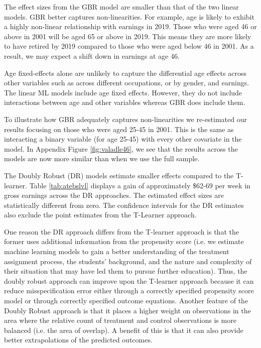 \documentclass[12pt, a4paper]{article}
\begin{document}
The effect sizes from the GBR model are smaller than that of the two linear models. GBR better captures non-linearities. For example, age is likely to exhibit a highly non-linear relationship with earnings in 2019. Those who were aged 46 or above in 2001 will be aged 65 or above in 2019. This means they are more likely to have retired by 2019 compared to those who were aged below 46 in 2001. As a result, we may expect a shift down in earnings at age 46. 

Age fixed-effects alone are unlikely to capture the differential age effects across other variables such as across different occupations, or by gender, and earnings. The linear ML models include age fixed effects. However, they do not include interactions between age and  other variables whereas GBR does include them.

To illustrate how GBR adequately captures non-linearities we re-estimated our results focusing on those who were aged 25-45 in 2001. This is the same as interacting a binary variable (for age 25-45) with every other covariate in the model. In Appendix Figure \ref{fig:valadle46}, we see that the results across the models are now more similar than when we use the full sample.

The Doubly Robust (DR) models estimate smaller effects compared to the T-learner. Table \ref{tab:atebslvl} displays a gain of approximately \$62-69 per week in gross earnings across the DR approaches. The estimated effect sizes are statistically different from zero. The confidence intervals for the DR estimates also exclude the point estimates from the T-Learner approach.

One reason the DR approach differs from the T-learner approach is that the former uses additional information from the propensity score (i.e. we estimate machine learning models to gain a better understanding of the treatment assignment process, the students’ background, and the nature and complexity of their situation that may have led them to pursue further education). Thus, the doubly robust approach can improve upon the T-learner approach because it can reduce misspecification error either through a correctly specified propensity score model or through correctly specified outcome equations. Another feature of the Doubly Robust approach is that it places a higher weight on observations in the area where the relative count of treatment and control observations is more balanced (i.e. the area of overlap). A benefit of this is that it can also provide better extrapolations of the predicted outcomes. 
\end{document}
